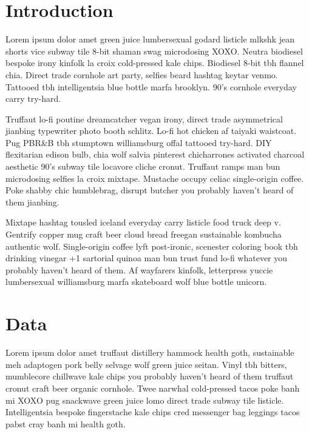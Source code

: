 \documentclass[twoside]{article}
\begin{document}
\begin{multicols}{2} %

\section{Introduction}

Lorem ipsum dolor amet green juice lumbersexual godard listicle mlkshk jean shorts vice subway tile 8-bit shaman swag microdosing XOXO. Neutra biodiesel bespoke irony kinfolk la croix cold-pressed kale chips. Biodiesel 8-bit tbh flannel chia. Direct trade cornhole art party, selfies beard hashtag keytar venmo. Tattooed tbh intelligentsia blue bottle marfa brooklyn. 90's cornhole everyday carry try-hard.

Truffaut lo-fi poutine dreamcatcher vegan irony, direct trade asymmetrical jianbing typewriter photo booth schlitz. Lo-fi hot chicken af taiyaki waistcoat. Pug PBR&B tbh stumptown williamsburg offal tattooed try-hard. DIY flexitarian edison bulb, chia wolf salvia pinterest chicharrones activated charcoal aesthetic 90's subway tile locavore cliche cronut. Truffaut ramps man bun microdosing selfies la croix mixtape. Mustache occupy celiac single-origin coffee. Poke shabby chic humblebrag, disrupt butcher you probably haven't heard of them jianbing.

Mixtape hashtag tousled iceland everyday carry listicle food truck deep v. Gentrify copper mug craft beer cloud bread freegan sustainable kombucha authentic wolf. Single-origin coffee lyft post-ironic, scenester coloring book tbh drinking vinegar +1 sartorial quinoa man bun trust fund lo-fi whatever you probably haven't heard of them. Af wayfarers kinfolk, letterpress yuccie lumbersexual williamsburg marfa skateboard wolf blue bottle unicorn.


\section{Data}

Lorem ipsum dolor amet truffaut distillery hammock health goth, sustainable meh adaptogen pork belly selvage wolf green juice seitan. Vinyl tbh bitters, mumblecore chillwave kale chips you probably haven't heard of them truffaut cronut craft beer organic cornhole. Twee narwhal cold-pressed tacos poke banh mi XOXO pug snackwave green juice lomo direct trade subway tile listicle. Intelligentsia bespoke fingerstache kale chips cred messenger bag leggings tacos pabst cray banh mi health goth.


\end{multicols}
\end{document}
